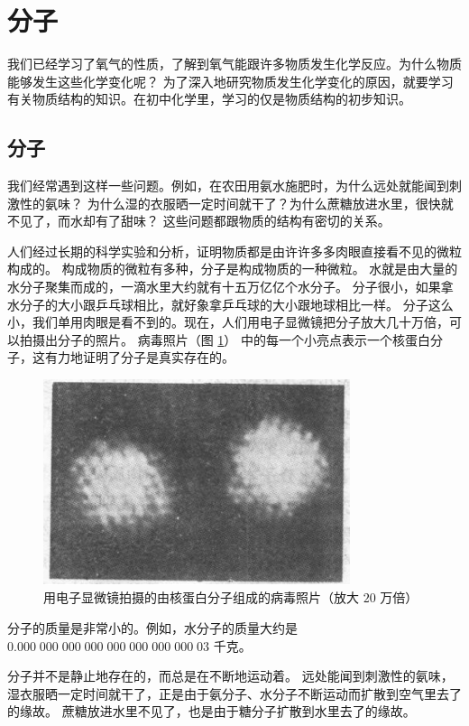 \section{分子}\label{sec:1-4}

我们已经学习了氧气的性质，了解到氧气能跟许多物质发生化学反应。为什么物质能够发生这些化学变化呢？
为了深入地研究物质发生化学变化的原因，就要学习有关物质结构的知识。在初中化学里，学习的仅是物质结构的初步知识。

\subsection{分子}

我们经常遇到这样一些问题。例如，在农田用氨水施肥时，为什么远处就能闻到刺激性的氨味？
为什么湿的衣服晒一定时间就干了？为什么蔗糖放进水里，很快就不见了，而水却有了甜味？
这些问题都跟物质的结构有密切的关系。

人们经过长期的科学实验和分析，证明物质都是由许许多多肉眼直接看不见的微粒构成的。
构成物质的微粒有多种，分子是构成物质的一种微粒。
水就是由大量的水分子聚集而成的，一滴水里大约就有十五万亿亿个水分子。
分子很小，如果拿水分子的大小跟乒乓球相比，就好象拿乒乓球的大小跟地球相比一样。
分子这么小，我们单用肉眼是看不到的。现在，人们用电子显微镜把分子放大几十万倍，可以拍摄出分子的照片。
病毒照片（图 \ref{fig:1-10}） 中的每一个小亮点表示一个核蛋白分子，这有力地证明了分子是真实存在的。

\begin{figure}[htbp]
    \centering
    \includegraphics[width=9cm]{../pic/czhx1-ch1-10}
    \caption{用电子显微镜拍摄的由核蛋白分子组成的病毒照片（放大 $20$ 万倍）}\label{fig:1-10}
\end{figure}

分子的质量是非常小的。例如，水分子的质量大约是 $0.000 \; 000 \; 000 \; 000 \; 000 \; 000 \; 000 \; 000 \; 03$ 千克。

分子并不是静止地存在的，而总是在不断地运动着。
远处能闻到刺激性的氨味，湿衣服晒一定时间就干了，正是由于氨分子、水分子不断运动而扩散到空气里去了的缘故。
蔗糖放进水里不见了，也是由于糖分子扩散到水里去了的缘故。

